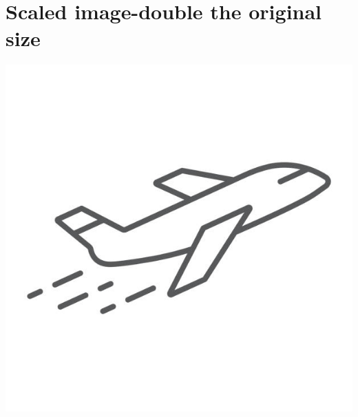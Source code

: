 \documentclass{article}
\begin{document}
	\section{Scaled image-double the original size}
	\includegraphics[scale=2]{plane.jpg}
\end{document}
